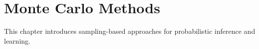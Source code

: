 
\chapter{Monte Carlo Methods}
\label{chap:monte-carlo}

This chapter introduces sampling-based approaches for probabilistic inference and learning.






